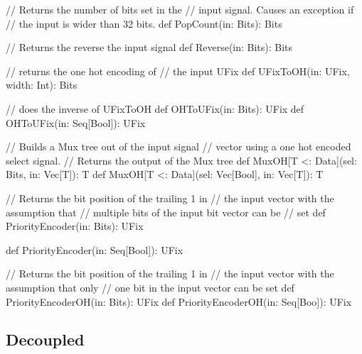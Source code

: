 \documentclass[10pt,twocolumn]{article}
\begin{document}
\begin{scala}
// Returns the number of bits set in the 
// input signal. Causes an exception if 
// the input is wider than 32 bits.
def PopCount(in: Bits): Bits

// Returns the reverse the input signal
def Reverse(in: Bits): Bits

// returns the one hot encoding of
// the input UFix
def UFixToOH(in: UFix, width: Int): Bits

// does the inverse of UFixToOH
def OHToUFix(in: Bits): UFix
def OHToUFix(in: Seq[Bool]): UFix

// Builds a Mux tree out of the input signal 
// vector using a one hot encoded select signal.
// Returns the output of the Mux tree
def MuxOH[T <: Data](sel: Bits, in: Vec[T]): T
def MuxOH[T <: Data](sel: Vec[Bool], in: Vec[T]): T

// Returns the bit position of the trailing 1 in 
// the input vector with the assumption that 
// multiple bits of the input bit vector can be 
// set
def PriorityEncoder(in: Bits): UFix

def PriorityEncoder(in: Seq[Bool]): UFix

// Returns the bit position of the trailing 1 in 
// the input vector with the assumption that only 
// one bit in the input vector can be set
def PriorityEncoderOH(in: Bits): UFix
def PriorityEncoderOH(in: Seq[Boo]): UFix
\end{scala}

\subsection{Decoupled}
\end{document}
